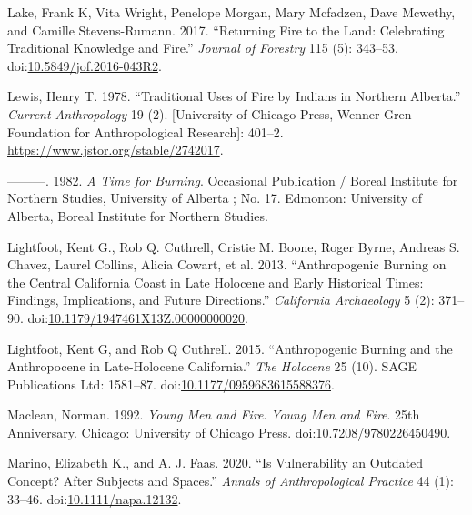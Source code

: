 \documentclass[
]{article}
\newlength{\cslhangindent}
\newenvironment{CSLReferences}[2] %
 {\begin{list}{}{%
  \setlength{\itemindent}{0pt}
  \setlength{\leftmargin}{0pt}
  \setlength{\parsep}{0pt}
  \ifodd #1
   \setlength{\leftmargin}{\cslhangindent}
   \setlength{\itemindent}{-1\cslhangindent}
  \fi
  \setlength{\itemsep}{#2\baselineskip}}}
 {\end{list}}
\begin{document}
\begin{CSLReferences}{1}{0}
Lake, Frank K, Vita Wright, Penelope Morgan, Mary Mcfadzen, Dave Mcwethy, and Camille Stevens-Rumann. 2017. {``Returning {Fire} to the {Land}: {Celebrating Traditional Knowledge} and {Fire}.''} \emph{Journal of Forestry} 115 (5): 343--53. doi:\href{https://doi.org/10.5849/jof.2016-043R2}{10.5849/jof.2016-043R2}.

Lewis, Henry T. 1978. {``Traditional {Uses} of {Fire} by {Indians} in {Northern Alberta}.''} \emph{Current Anthropology} 19 (2). {[}University of Chicago Press, Wenner-Gren Foundation for Anthropological Research{]}: 401--2. \url{https://www.jstor.org/stable/2742017}.

---------. 1982. \emph{A {Time} for Burning}. Occasional Publication / {Boreal Institute} for {Northern Studies}, {University} of {Alberta} ; No. 17. Edmonton: University of Alberta, Boreal Institute for Northern Studies.

Lightfoot, Kent G., Rob Q. Cuthrell, Cristie M. Boone, Roger Byrne, Andreas S. Chavez, Laurel Collins, Alicia Cowart, et al. 2013. {``Anthropogenic {Burning} on the {Central California Coast} in {Late Holocene} and {Early Historical Times}: {Findings}, {Implications}, and {Future Directions}.''} \emph{California Archaeology} 5 (2): 371--90. doi:\href{https://doi.org/10.1179/1947461X13Z.00000000020}{10.1179/1947461X13Z.00000000020}.

Lightfoot, Kent G, and Rob Q Cuthrell. 2015. {``Anthropogenic Burning and the {Anthropocene} in Late-{Holocene California}.''} \emph{The Holocene} 25 (10). SAGE Publications Ltd: 1581--87. doi:\href{https://doi.org/10.1177/0959683615588376}{10.1177/0959683615588376}.

Maclean, Norman. 1992. \emph{Young {Men} and {Fire}}. \emph{Young Men and Fire}. 25th Anniversary. Chicago: University of Chicago Press. doi:\href{https://doi.org/10.7208/9780226450490}{10.7208/9780226450490}.

Marino, Elizabeth K., and A. J. Faas. 2020. {``Is {Vulnerability} an {Outdated Concept}? {After Subjects} and {Spaces}.''} \emph{Annals of Anthropological Practice} 44 (1): 33--46. doi:\href{https://doi.org/10.1111/napa.12132}{10.1111/napa.12132}.


\end{CSLReferences}
\end{document}
